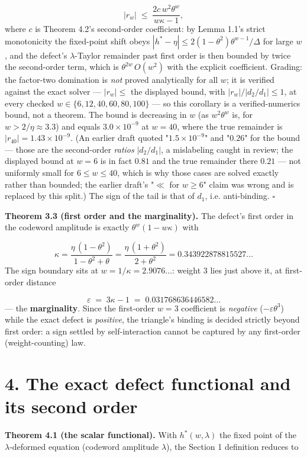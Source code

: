 \documentclass[11pt]{article}
\begin{document}
\[
|r_w| \;\le\; \frac{2c\,w^2\theta^{w}}{w\kappa - 1},
\]
where $c$ is Theorem 4.2's second-order coefficient: by Lemma 1.1's strict monotonicity the fixed-point shift obeys $|h^* - \eta| \le 2(1-\theta^2)\theta^{w-1}/\Delta$ for large $w$, and the defect's $\lambda$-Taylor remainder past first order is then bounded by twice the second-order term, which is $\theta^{2w}\,O(w^2)$ with the explicit coefficient.  Grading: the factor-two domination is \emph{not} proved analytically for all $w$; it is verified against the exact solver — $|r_w| \le$ the displayed bound, with $|r_w|/|d_2/d_1| \le 1$, at every checked $w \in \{6, 12, 40, 60, 80, 100\}$ — so this corollary is a verified-numerics bound, not a theorem.  The bound is decreasing in $w$ (as $w^2\theta^w$ is, for $w > 2/\eta \approx 3.3$) and equals $3.0\times 10^{-9}$ at $w = 40$, where the true remainder is $|r_{40}| = 1.43\times 10^{-9}$.  (An earlier draft quoted "$1.5\times 10^{-9}$" and "$0.26$" for the bound — those are the second-order \emph{ratios} $|d_2/d_1|$, a mislabeling caught in review; the displayed bound at $w = 6$ is in fact $0.81$ and the true remainder there $0.21$ — not uniformly small for $6 \le w \le 40$, which is why those cases are solved exactly rather than bounded; the earlier draft's "$\ll$ for $w \ge 6$" claim was wrong and is replaced by this split.)  The sign of the tail is that of $d_1$, i.e. anti-binding.  $\square$

\textbf{Theorem 3.3 (first order and the marginality).}  The defect's first order in the codeword amplitude is exactly $\theta^w(1 - w\kappa)$ with

\[
\kappa = \frac{\eta\,(1-\theta^2)}{1-\theta^2+\theta}
= \frac{\eta\,(1+\theta^2)}{2+\theta^2}
= 0.343922878815527\ldots
\]
The sign boundary sits at $w = 1/\kappa = 2.9076\ldots$: weight 3 lies just above it, at first-order distance

\[
\varepsilon \;=\; 3\kappa - 1 \;=\; 0.031768636446582\ldots
\]
— the \textbf{marginality}.  Since the first-order $w = 3$ coefficient is \emph{negative} ($-\varepsilon\theta^3$) while the exact defect is \emph{positive}, the triangle's binding is decided strictly beyond first order: a sign settled by self-interaction cannot be captured by any first-order (weight-counting) law.

\section*{4. The exact defect functional and its second order}
\textbf{Theorem 4.1 (the scalar functional).}  With $h^*(w,\lambda)$ the fixed point of the $\lambda$-deformed equation (codeword amplitude $\lambda$), the Section 1 definition reduces to
\end{document}
